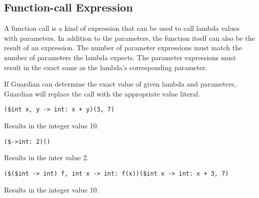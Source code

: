
\subsection{Function-call Expression}
{
	A function call is a kind of expression that can be used to call
	lambda values with parameters. In addition to the parameters,
	the function itself can also be the result of an expression.
	The number of parameter expressions must match the number of parameters
	the lambda expects. The parameter expressions must result in the
	exact same as the lambda's corresponding parameter.
	
	If Guardian can determine the exact value of given lambda and parameters,
	Guardian
	will replace the call with the appropriate value literal.
	
	\begin{itemize}
	{
		\item[] \texttt{(\$int x, y -> int: x + y)(3, 7)}
		
			Results in the integer value 10.
		
		\item[] \texttt{(\$->int: 2)()}
		
			Results in the inter value 2.
		
		\item[] \texttt{(\$(\$int -> int) f, int x -> int: f(x))(\$int x -> int: x + 3, 7)}
		
			Results in the integer value 10.
	}
	\end{itemize}
}
